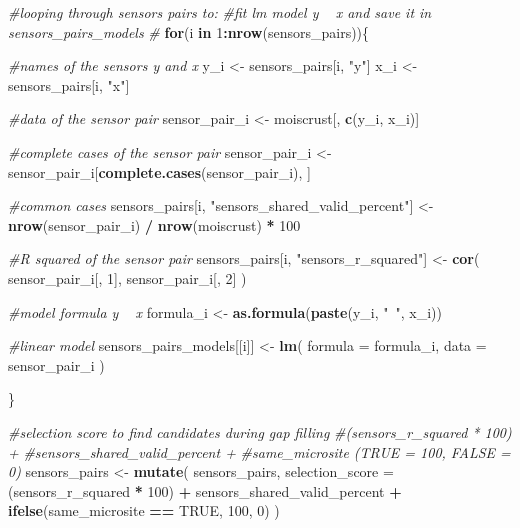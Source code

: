 \documentclass[]{article}
\newenvironment{Shaded}{\begin{snugshade}}{\end{snugshade}}
\newcommand{\CommentTok}[1]{\textcolor[rgb]{0.56,0.35,0.01}{\textit{#1}}}
\newcommand{\ControlFlowTok}[1]{\textcolor[rgb]{0.13,0.29,0.53}{\textbf{#1}}}
\newcommand{\DataTypeTok}[1]{\textcolor[rgb]{0.13,0.29,0.53}{#1}}
\newcommand{\DecValTok}[1]{\textcolor[rgb]{0.00,0.00,0.81}{#1}}
\newcommand{\KeywordTok}[1]{\textcolor[rgb]{0.13,0.29,0.53}{\textbf{#1}}}
\newcommand{\NormalTok}[1]{#1}
\newcommand{\OperatorTok}[1]{\textcolor[rgb]{0.81,0.36,0.00}{\textbf{#1}}}
\newcommand{\OtherTok}[1]{\textcolor[rgb]{0.56,0.35,0.01}{#1}}
\newcommand{\StringTok}[1]{\textcolor[rgb]{0.31,0.60,0.02}{#1}}
\begin{document}
\begin{Shaded}
\begin{Highlighting}[]
{{{{{{{{{\CommentTok{#looping through sensors pairs to:}
\CommentTok{#fit lm model y ~ x and save it in sensors_pairs_models}
\CommentTok{#}
\ControlFlowTok{for}\NormalTok{(i }\ControlFlowTok{in} \DecValTok{1}\OperatorTok{:}\KeywordTok{nrow}\NormalTok{(sensors_pairs))\{}
  
  \CommentTok{#names of the sensors y and x}
\NormalTok{  y_i <-}\StringTok{ }\NormalTok{sensors_pairs[i, }\StringTok{"y"}\NormalTok{]}
\NormalTok{  x_i <-}\StringTok{ }\NormalTok{sensors_pairs[i, }\StringTok{"x"}\NormalTok{]}
  
  \CommentTok{#data of the sensor pair}
\NormalTok{  sensor_pair_i <-}\StringTok{ }\NormalTok{moiscrust[, }\KeywordTok{c}\NormalTok{(y_i, x_i)]}
  
  \CommentTok{#complete cases of the sensor pair}
\NormalTok{  sensor_pair_i <-}\StringTok{ }\NormalTok{sensor_pair_i[}\KeywordTok{complete.cases}\NormalTok{(sensor_pair_i), ]}
   
  \CommentTok{#common cases}
\NormalTok{  sensors_pairs[i, }\StringTok{"sensors_shared_valid_percent"}\NormalTok{] <-}\StringTok{ }
\StringTok{    }\KeywordTok{nrow}\NormalTok{(sensor_pair_i) }\OperatorTok{/}\StringTok{ }\KeywordTok{nrow}\NormalTok{(moiscrust) }\OperatorTok{*}\StringTok{ }\DecValTok{100}
  
  \CommentTok{#R squared of the sensor pair}
\NormalTok{  sensors_pairs[i, }\StringTok{"sensors_r_squared"}\NormalTok{] <-}\StringTok{ }\KeywordTok{cor}\NormalTok{(}
\NormalTok{    sensor_pair_i[, }\DecValTok{1}\NormalTok{],}
\NormalTok{    sensor_pair_i[, }\DecValTok{2}\NormalTok{]}
\NormalTok{    )}
  
  \CommentTok{#model formula y ~ x}
\NormalTok{  formula_i <-}\StringTok{ }\KeywordTok{as.formula}\NormalTok{(}\KeywordTok{paste}\NormalTok{(y_i, }\StringTok{"~"}\NormalTok{, x_i))}
  
  \CommentTok{#linear model}
\NormalTok{  sensors_pairs_models[[i]] <-}\StringTok{ }\KeywordTok{lm}\NormalTok{(}
    \DataTypeTok{formula =}\NormalTok{ formula_i,}
    \DataTypeTok{data =}\NormalTok{ sensor_pair_i}
\NormalTok{  )}
  
\NormalTok{\}}

\CommentTok{#selection score to find candidates during gap filling }
\CommentTok{#(sensors_r_squared * 100) +}
\CommentTok{#sensors_shared_valid_percent + }
\CommentTok{#same_microsite (TRUE = 100, FALSE = 0)}
\NormalTok{sensors_pairs <-}\StringTok{ }\KeywordTok{mutate}\NormalTok{(}
\NormalTok{  sensors_pairs,}
  \DataTypeTok{selection_score =} 
\NormalTok{    (sensors_r_squared }\OperatorTok{*}\StringTok{ }\DecValTok{100}\NormalTok{) }\OperatorTok{+}\StringTok{ }
\StringTok{    }\NormalTok{sensors_shared_valid_percent }\OperatorTok{+}\StringTok{ }
\StringTok{    }\KeywordTok{ifelse}\NormalTok{(same_microsite }\OperatorTok{==}\StringTok{ }\OtherTok{TRUE}\NormalTok{, }\DecValTok{100}\NormalTok{, }\DecValTok{0}\NormalTok{)}
\NormalTok{)}

}}}}}}}}}
\end{Highlighting}
\end{Shaded}
\end{document}
